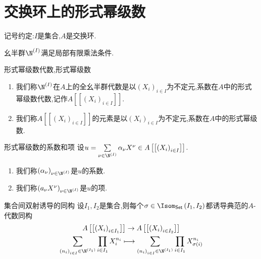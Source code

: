 \section{交换环上的形式幂级数}

记号约定:$I$是集合,$A$是交换环.

\begin{proposition}{}{}
	幺半群$\N^{\left(I\right)}$满足局部有限乘法条件.
\end{proposition}

\begin{definition}{形式幂级数代数,形式幂级数}{}
	\begin{enumerate}
		\item 我们称$\N^{\left(I\right)}$在$A$上的全幺半群代数是以$\left(X_{i}\right)_{i\in I}$为不定元,系数在$A$中的形式幂级数代数,记作$A\left[\left[\left(X_{i}\right)_{i\in I}\right]\right]$.
		\item 我们称$A\left[\left[\left(X_{i}\right)_{i\in I}\right]\right]$的元素是以$\left(X_{i}\right)_{i\in I}$为不定元,系数在$A$中的形式幂级数.
	\end{enumerate}
\end{definition}

\begin{definition}{形式幂级数的系数和项}{}
	设$u=\sum\limits_{\nu\in\N^{\left(I\right)}}\alpha_{\nu}X^{\nu}\in A\left[\left[\left(X_{i}\right)_{i\in I}\right]\right]$.
	\begin{enumerate}
		\item 我们称$\left(\alpha_{\nu}\right)_{\nu\in\N^{\left(I\right)}}$是$u$的系数.
		\item 我们称$\left(a_{\nu}X^{\nu}\right)_{\nu\in\N^{\left(I\right)}}$是$u$的项.
	\end{enumerate}
\end{definition}

\begin{proposition}{集合间双射诱导的同构}{}
	设$I_{1},I_{2}$是集合,则每个$\sigma\in\Isom_{\mathsf{Set}}\left(I_{1},I_{2}\right)$都诱导典范的$A$-代数同构
	\begin{gather*}
		A\left[\left[\left(X_{i}\right)_{i\in I_{1}}\right]\right]\to A\left[\left[\left(X_{i}\right)_{i\in I_{2}}\right]\right]\\
		\sum\limits_{\left(n_{i}\right)_{i\in I}\in\N^{\left(I_{1}\right)}}\prod\limits_{i\in I_{1}}X_{i}^{n_{i}}   
		\longmapsto
		\sum\limits_{\left(n_{i}\right)_{i\in I}\in\N^{\left(I_{1}\right)}}\prod\limits_{i\in I_{1}}X_{\sigma\left(i\right)}^{n_{i}}
	\end{gather*}
\end{proposition}


